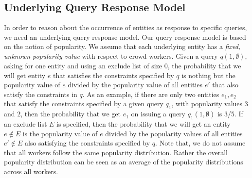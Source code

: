 \subsection{Underlying Query Response Model}
\label{sec:sampling}
In order to reason about the occurrence of entities as response to specific queries, we need an underlying query response model. Our query response model is based on the notion of popularity.
\ifpaper We assume that each underlying entity has a {\em fixed, unknown popularity value} with respect to crowd workers. Given a query $q(1, \emptyset)$, asking for one entity and using an exclude list of size $0$, the probability that we will get entity $e$ that satisfies the constraints specified by $q$ is nothing but the popularity value of $e$ divided by the popularity value of all entities $e'$ that also satisfy the constraints in $q$. As an example, if there are only two entities $e_1, e_2$ that satisfy the constraints specified by a given query $q_1$, with popularity values $3$ and $2$,
then the probability that we get $e_1$ on issuing a query $q_1(1, \emptyset)$ is 3/5. If an exclude list $E$ is specified, then the probability that we will get an entity $e \notin E$ is the popularity value of $e$ divided by the popularity values of all entities $e' \notin E$ also satisfying the constraints specified by $q$. Note that, we do not assume that all workers follow the same popularity distribution. Rather the overall popularity distribution can be seen as an average of the popularity distributions across all workers.

